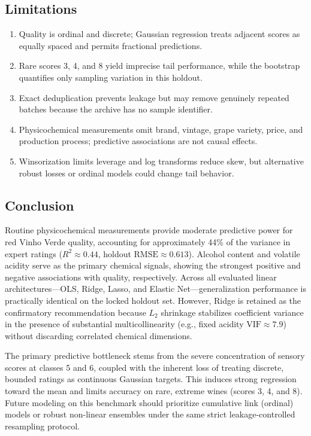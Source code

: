 \documentclass[
  10pt,
]{article}
\providecommand{\tightlist}{%
  \setlength{\itemsep}{0pt}\setlength{\parskip}{0pt}}
\begin{document}
\subsection{Limitations}\label{limitations}

\begin{enumerate}
\def\labelenumi{\arabic{enumi}.}
\tightlist
\item
  Quality is ordinal and discrete; Gaussian regression treats adjacent
  scores as equally spaced and permits fractional predictions.
\item
  Rare scores 3, 4, and 8 yield imprecise tail performance, while the
  bootstrap quantifies only sampling variation in this holdout.
\item
  Exact deduplication prevents leakage but may remove genuinely repeated
  batches because the archive has no sample identifier.
\item
  Physicochemical measurements omit brand, vintage, grape variety,
  price, and production process; predictive associations are not causal
  effects.
\item
  Winsorization limits leverage and log transforms reduce skew, but
  alternative robust losses or ordinal models could change tail
  behavior.
\end{enumerate}

\subsection{Conclusion}\label{conclusion}

Routine physicochemical measurements provide moderate predictive power
for red Vinho Verde quality, accounting for approximately 44\% of the
variance in expert ratings (\(R^2 \approx 0.44\), holdout
\(\text{RMSE} \approx 0.613\)). Alcohol content and volatile acidity
serve as the primary chemical signals, showing the strongest positive
and negative associations with quality, respectively. Across all
evaluated linear architectures---OLS, Ridge, Lasso, and Elastic
Net---generalization performance is practically identical on the locked
holdout set. However, Ridge is retained as the confirmatory
recommendation because \(L_2\) shrinkage stabilizes coefficient variance
in the presence of substantial multicollinearity (e.g., fixed acidity
\(\text{VIF} \approx 7.9\)) without discarding correlated chemical
dimensions.

The primary predictive bottleneck stems from the severe concentration of
sensory scores at classes 5 and 6, coupled with the inherent loss of
treating discrete, bounded ratings as continuous Gaussian targets. This
induces strong regression toward the mean and limits accuracy on rare,
extreme wines (scores 3, 4, and 8). Future modeling on this benchmark
should prioritize cumulative link (ordinal) models or robust non-linear
ensembles under the same strict leakage-controlled resampling protocol.
\end{document}
